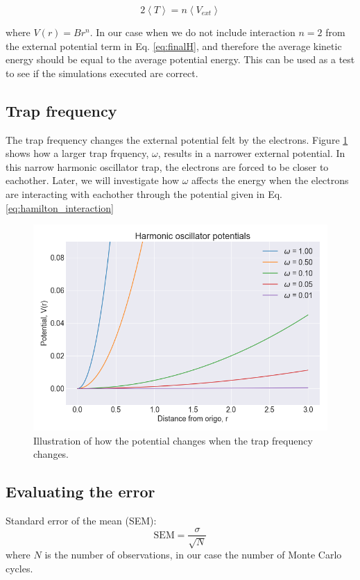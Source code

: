\begin{equation}\label{eq:virial_theorem}
2\left< T\right> = n\left< V_{ext}\right>
\end{equation}

where $V(r) = Br^n$. In our case when we do not include interaction $n = 2$ from the external potential term in Eq. \ref{eq:finalH}, and therefore the average kinetic energy should be equal to the average potential energy. This can be used as a test to see if the simulations executed are correct. 

\subsection{Trap frequency}

The trap frequency changes the external potential felt by the electrons. Figure \ref{fig:harmonic_oscillator_potential} shows how a larger trap frquency, $\omega$, results in a narrower external potential. In this narrow harmonic oscillator trap, the electrons are forced to be closer to eachother. Later, we will investigate how $\omega$ affects the energy when the electrons are interacting with eachother through the potential given in Eq. \ref{eq:hamilton_interaction}

\begin{figure}[H]
\center
\includegraphics[width=0.7\linewidth]{../Results/harmonic_oscialltor_potentials}\caption{Illustration of how the potential changes when the trap frequency changes. }\label{fig:harmonic_oscillator_potential}
\end{figure}

\subsection{Evaluating the error}

Standard error of the mean (SEM):
\begin{equation}
\text{SEM} = \frac{\sigma}{\sqrt{N}}
\end{equation}
where $N$ is the number of observations, in our case the number of Monte Carlo cycles.